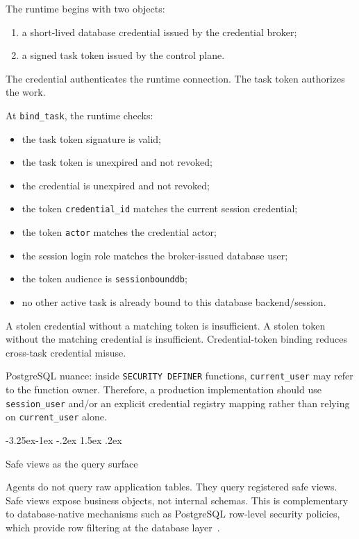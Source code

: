 \documentclass[10pt,twocolumn]{article}
\makeatletter
\providecommand{\tightlist}{%
  \setlength{\itemsep}{0pt}\setlength{\parskip}{0pt}}
\renewcommand\subsection{\@startsection{subsection}{2}{\z@}%
  {-3.25ex\@plus -1ex \@minus -.2ex}%
  {1.5ex \@plus .2ex}%
  {\normalfont\large\bfseries\raggedright}}
\makeatother
\begin{document}
The runtime begins with two objects:

\begin{enumerate}
\def\labelenumi{\arabic{enumi}.}
\tightlist
\item
  a short-lived database credential issued by the credential broker;
\item
  a signed task token issued by the control plane.
\end{enumerate}

The credential authenticates the runtime connection. The task token
authorizes the work.

At \texttt{bind\_task}, the runtime checks:

\begin{itemize}
\tightlist
\item
  the task token signature is valid;
\item
  the task token is unexpired and not revoked;
\item
  the credential is unexpired and not revoked;
\item
  the token \texttt{credential\_id} matches the current session
  credential;
\item
  the token \texttt{actor} matches the credential actor;
\item
  the session login role matches the broker-issued database user;
\item
  the token audience is \texttt{sessionbounddb};
\item
  no other active task is already bound to this database
  backend/session.
\end{itemize}

A stolen credential without a matching token is insufficient. A stolen
token without the matching credential is insufficient. Credential-token
binding reduces cross-task credential misuse.

PostgreSQL nuance: inside \texttt{SECURITY\ DEFINER} functions,
\texttt{current\_user} may refer to the function owner. Therefore, a
production implementation should use \texttt{session\_user} and/or an
explicit credential registry mapping rather than relying on
\texttt{current\_user} alone.

\hypertarget{safe-views-as-the-query-surface}{%
\subsection{Safe views as the query
surface}\label{safe-views-as-the-query-surface}}

Agents do not query raw application tables. They query registered safe
views. Safe views expose business objects, not internal schemas. This is
complementary to database-native mechanisms such as PostgreSQL
row-level security policies, which provide row filtering at the database
layer~\cite{postgresql2026rowsecurity}.
\end{document}
